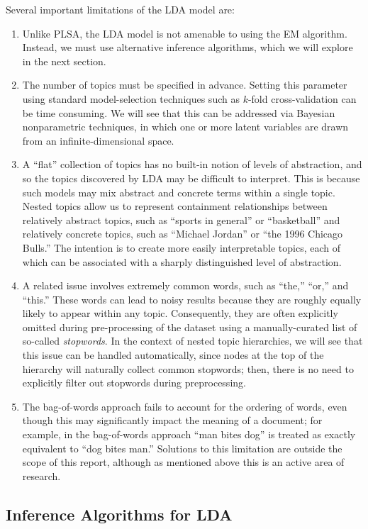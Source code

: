 \documentclass{article}
\begin{document}
Several important limitations of the LDA model are:
\begin{enumerate}
\item Unlike PLSA, the LDA model is not amenable to using the EM algorithm.
Instead, we must use alternative inference algorithms, which we will explore in the next section.
\item The number of topics must be specified in advance.
Setting this parameter using standard model-selection techniques such as $k$-fold cross-validation can be time consuming.
We will see that this can be addressed via Bayesian nonparametric techniques, in which one or more latent variables are drawn from an infinite-dimensional space.
\item A ``flat'' collection of topics has no built-in notion of levels of abstraction, and so the topics discovered by LDA may be difficult to interpret.
This is because such models may mix abstract and concrete terms within a single topic.
Nested topics allow us to represent containment relationships between relatively abstract topics, such as ``sports in general'' or ``basketball'' and relatively concrete topics, such as ``Michael Jordan'' or ``the 1996 Chicago Bulls.''
The intention is to create more easily interpretable topics, each of which can be associated with a sharply distinguished level of abstraction.
\item A related issue involves extremely common words, such as ``the,'' ``or,'' and ``this.''
These words can lead to noisy results because they are roughly equally likely to appear within any topic.
Consequently, they are often explicitly omitted during pre-processing of the dataset using a manually-curated list of so-called \emph{stopwords}.
In the context of nested topic hierarchies, we will see that this issue can be handled automatically, since nodes at the top of the hierarchy will naturally collect common stopwords; then, there is no need to explicitly filter out stopwords during preprocessing.
\item The bag-of-words approach fails to account for the ordering of words, even though this may significantly impact the meaning of a document; for example, in the bag-of-words approach ``man bites dog'' is treated as exactly equivalent to ``dog bites man.''
Solutions to this limitation are outside the scope of this report, although as mentioned above this is an active area of research.
\end{enumerate}

\subsection{Inference Algorithms for LDA}
\end{document}
